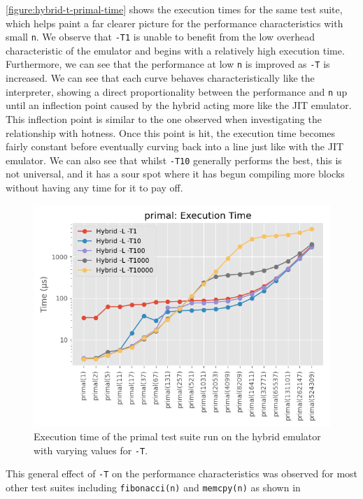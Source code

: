 \autoref{figure:hybrid-t-primal-time} shows the execution times for the same test suite, which helps paint a far clearer picture for the performance characteristics with small \texttt{n}. We observe that \texttt{-T1} is unable to benefit from the low overhead characteristic of the emulator and begins with a relatively high execution time. Furthermore, we can see that the performance at low \texttt{n} is improved as \texttt{-T} is increased. We can see that each curve behaves characteristically like the interpreter, showing a direct proportionality between the performance and \texttt{n} up until an inflection point caused by the hybrid acting more like the JIT emulator. This inflection point is similar to the one observed when investigating the relationship with hotness. Once this point is hit, the execution time becomes fairly constant before eventually curving back into a line just like with the JIT emulator. We can also see that whilst \texttt{-T10} generally performs the best, this is not universal, and it has a sour spot where it has begun compiling more blocks without having any time for it to pay off.

\begin{figure}[H]
    \centering
    \includegraphics[scale=0.75]{output/graphs/tests/hybrid_t/primal/time.png}
    \caption{Execution time of the primal test suite run on the hybrid emulator with varying values for \texttt{-T}.}
    \label{figure:hybrid-t-primal-time}
\end{figure}

This general effect of \texttt{-T} on the performance characteristics was observed for most other test suites including \texttt{fibonacci(n)} and \texttt{memcpy(n)} as shown in 

